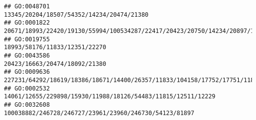 \documentclass[
]{article}
\begin{document}
\begin{verbatim}
## GO:0048701                                                                                                                                                                                                                                                                                                                                                                    13345/20204/18507/54352/14234/20474/21380
## GO:0001822                                                                                                                                                                                                                                                                     20671/18993/22420/19130/55994/100534287/22417/20423/20750/14234/20897/14561/20666/20474/14165/218772/18095/15117/22270/19876/14585/12705
## GO:0019755                                                                                                                                                                                                                                                                                                                                                                                18993/58176/11833/12351/22270
## GO:0043586                                                                                                                                                                                                                                                                                                                                                                                20423/16663/20474/18092/21380
## GO:0009636                                                                                                                                                                                                                                                                                                            227231/64292/18619/18386/18671/14400/26357/11833/104158/17752/17751/11808/20304/20519/13078/12780
## GO:0002532                                                                                                                                                                                                                                                                                                                                                 14061/12655/229898/15930/11988/18126/54483/11815/12511/12229
## GO:0032608                                                                                                                                                                                                                                                                                                                                                       100038882/246728/246727/23961/23960/246730/54123/81897

\end{verbatim}
\end{document}
